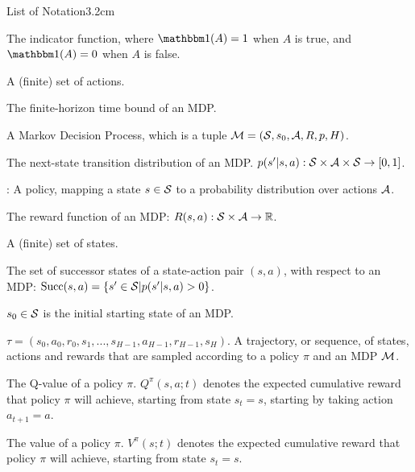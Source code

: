 
\begin{mclistof}{List of Notation}{3.2cm}


    \item[\Large\textbf{Global Notation}\hfill\hfill]
    \item[$\one$] 
        The indicator function, where $\one(A)=1$ when $A$ is true, and $\one(A)=0$ when $A$ is false. 
    \\
    \item[\Large\textbf{Markov Decision Processes (Section \ref{sec:2-1-mdps})}\hfill\hfill]
    \item[$\cl{A}$]
        A (finite) set of actions.
    \item[$H$]
        The finite-horizon time bound of an MDP.
    \item[$\cl{M}$]
        A Markov Decision Process, which is a tuple $\mathcal{M}=(\mathcal{S},s_0,\mathcal{A},R,p,H)$.
    \item[$p$] 
        The next-state transition distribution of an MDP.  $p(s' | s,a) : \mathcal{S} \times \mathcal{A} \times \mathcal{S} \rightarrow [0,1]$.
    \item[$\pi$]:
        A policy, mapping a state $s\in\mathcal{S}$ to a probability distribution over actions $\cl{A}$.
    \item[$R$] 
        The reward function of an MDP: $R(s,a) : \mathcal{S}\times \mathcal{A}\rightarrow \mathbb{R}$.
    \item[$\cl{S}$]
        A (finite) set of states.
    \item[$\suc(s,a)$]
        The set of successor states of a state-action pair $(s,a)$, with respect to an MDP: ${\textnormal{Succ}(s,a)}=\{s'\in\mathcal{S}|p(s'|s,a)>0\}$.
    \item[$s_0$]
        $s_0\in\mathcal{S}$ is the initial starting state of an MDP.
    \item[$\tau$]
        $\tau = (s_0, a_0, r_0, s_1, ..., s_{H-1}, a_{H-1}, r_{H-1}, s_H)$. A trajectory, or sequence, of states, actions and rewards that are sampled according to a policy $\pi$ and an MDP $\cl{M}$.
    \\
    \item[\Large\textbf{Reinforcement Learning (Section \ref{sec:2-2-rl})}\hfill\hfill]
    \item[$Q^{\pi}$]
        The Q-value of a policy $\pi$. $Q^{\pi}(s,a;t)$ denotes the expected cumulative reward that policy $\pi$ will achieve, starting from state $s_t=s$, starting by taking action $a_{t+1}=a$.
    \item[$V^{\pi}$]
        The value of a policy $\pi$. $V^{\pi}(s;t)$ denotes the expected cumulative reward that policy $\pi$ will achieve, starting from state $s_t=s$.
    





\end{mclistof}
